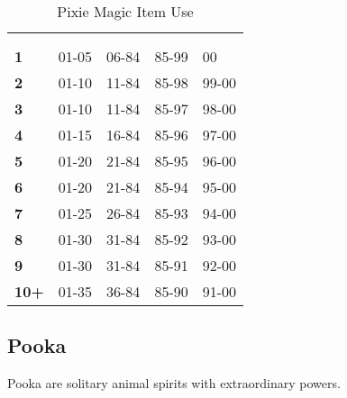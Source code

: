 \begin{multicols*}{2}
\begin {table}[H]
  \caption{Pixie Magic Item Use}\label{tab:Pixie Magic Item Use}
  \begin{tabularx}{\columnwidth}{>{\bfseries}YYYYY}
	\thead{} & \\
	 &  &  &  & \\
	1 & 01-05 & 06-84 & 85-99 & 00\\
	2 & 01-10 & 11-84 & 85-98 & 99-00\\
	3 & 01-10 & 11-84 & 85-97 & 98-00\\
	4 & 01-15 & 16-84 & 85-96 & 97-00\\
	5 & 01-20 & 21-84 & 85-95 & 96-00\\
	6 & 01-20 & 21-84 & 85-94 & 95-00\\
	7 & 01-25 & 26-84 & 85-93 & 94-00\\
	8 & 01-30 & 31-84 & 85-92 & 93-00\\
	9 & 01-30 & 31-84 & 85-91 & 92-00\\
	10+ & 01-35 & 36-84 & 85-90 & 91-00
  \end {tabularx}
\end {table}

\subsection{Pooka}

Pooka are solitary animal spirits with extraordinary powers.


\end{multicols*}
